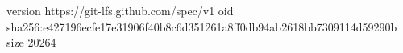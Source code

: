 version https://git-lfs.github.com/spec/v1
oid sha256:e427196ecfe17e31906f40b8c6d351261a8ff0db94ab2618bb7309114d59290b
size 20264
